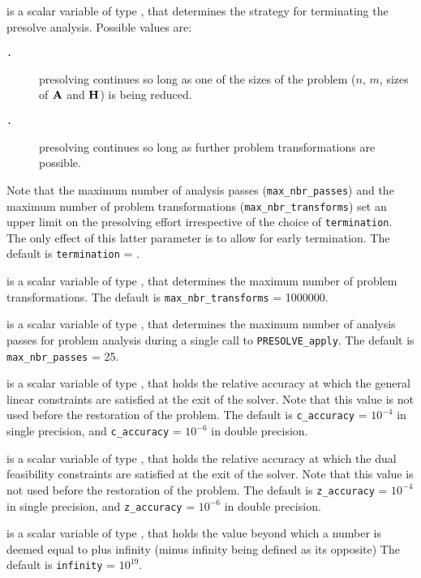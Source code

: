 \documentclass{galahad}
\newcommand{\packagename}{PRESOLVE}
\newcommand{\sym}{\tt\small}
\begin{document}
\begin{description}
 is a scalar variable of type \integer, that
determines the strategy for terminating the presolve analysis.
Possible values are:
\begin{description}
\item[\sym \galsymreducedsize.]  presolving continues so long as one of
            the sizes of the problem ($n$, $m$, sizes of ${\mathbf{A}}$ and ${\mathbf{H}}$) is
            being reduced.
\item[\sym \galsymfullpresolve.] presolving continues so long as further
            problem transformations are possible.
\end{description}
Note that the maximum number of analysis passes ({\tt max\_nbr\_passes})  and
the maximum number of problem transformations ({\tt max\_nbr\_transforms})
set an upper limit on the  presolving effort irrespective of the choice of
{\tt termination}. The only effect of this latter parameter is to allow for
early termination.
The default is {\tt termination} = {\sym \galsymreducedsize}.

 is a scalar variable of type \integer, that
determines the maximum number of problem transformations.
The default is {\tt max\_nbr\_transforms} = 1000000.

 is a scalar variable of type \integer, that
determines the maximum number of analysis passes for problem analysis
during a single call to {\tt \packagename\_apply}.
The default is {\tt max\_nbr\_passes} = 25.

 is a scalar variable of type \realdp, that holds the
relative accuracy at which the general linear constraints are satisfied at
the exit of the solver. Note that this value is not used before the restoration
of the problem.
The default is {\tt c\_accuracy} = $10^{-4}$ in single precision, and
{\tt c\_accuracy} = $10^{-6}$ in double precision.

 is a scalar variable of type \realdp, that holds the
relative accuracy at which the dual feasibility constraints are satisfied at
the exit of the solver. Note that this value is not used before the restoration
of the problem.
The default is {\tt z\_accuracy} = $10^{-4}$ in single precision, and
{\tt z\_accuracy} = $10^{-6}$ in double precision.

 is a scalar variable of type \realdp, that holds the
value beyond which a number is deemed equal to plus infinity
(minus infinity being defined as its opposite)
The default is {\tt infinity} = $10^{19}$.


\end{description}
\end{document}
